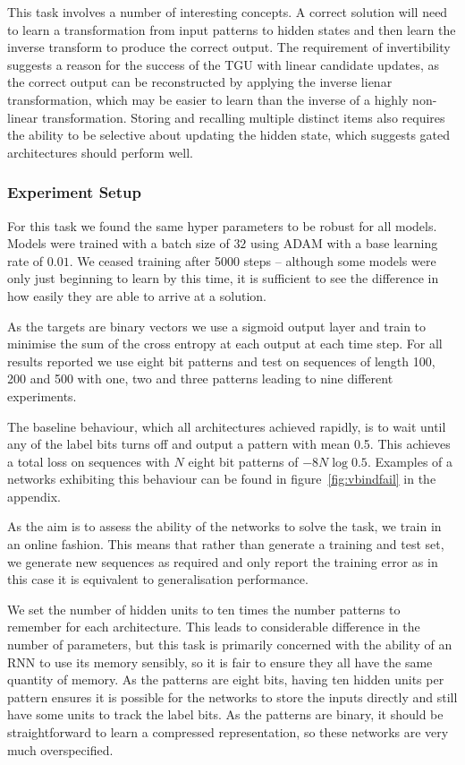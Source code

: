 This task involves a number of interesting concepts. A correct solution will need to learn a
transformation from input patterns to hidden states and then learn the inverse transform
to produce the correct output. The requirement of invertibility suggests a reason
for the success of the TGU with linear candidate updates, as the correct output can be reconstructed
by applying the inverse lienar transformation, which may be easier to learn than the inverse of a
highly non-linear transformation. Storing and recalling multiple distinct items also 
requires the ability to be selective about updating the hidden state, which suggests gated architectures
should perform well.

\subsubsection{Experiment Setup}
For this task we found the same hyper parameters to be robust for all models.
Models were trained with a batch size of \(32\) using ADAM with a base learning rate of \(0.01\).
We ceased training after 5000 steps --  although some models were only just beginning to learn
by this time, it is sufficient to see the difference in how easily they are able to arrive
at a solution.

As the targets are binary vectors we use a sigmoid output layer and train to minimise the
sum of the cross entropy at each output at each time step.
For all results reported we use eight bit patterns and test on sequences of length 100, 200 and 500
with one, two and three patterns leading to nine different experiments.

The baseline behaviour, which all architectures achieved rapidly,
is to wait until any of the label bits turns off and output a pattern with mean 0.5. This
achieves a total loss on sequences with \(N\) eight bit patterns of \(-8N\log 0.5\).
Examples of a networks exhibiting this behaviour can be found in figure~\ref{fig:vbindfail}
in the appendix.

As the aim is to assess the ability of the networks to solve the task, we train in an online
fashion. This means that rather than generate a training and test set, we generate new sequences
as required and only report the training error as in this case it is equivalent to generalisation
performance.

We set the number of hidden units to ten times the number patterns to remember for each architecture.
This leads to considerable difference in the number of parameters, but this task is primarily
concerned with the ability of an RNN to use its memory sensibly, so it is fair to ensure they
all have the same quantity of memory. As the patterns are eight bits, having ten hidden units
per pattern ensures it is possible for the networks to store the inputs directly and still have
some units to track the label bits. As the patterns are binary, it should be
straightforward to learn a compressed representation, so these networks are very much overspecified.

